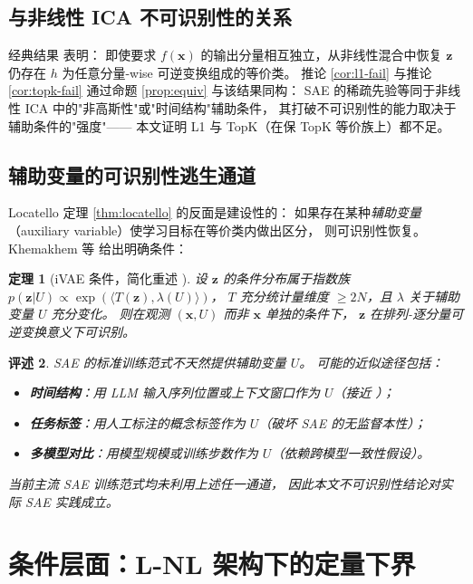 \documentclass[11pt,a4paper]{article}
\newtheorem{theorem}{定理}
\newtheorem{remark}[theorem]{评述}
\theoremstyle{remark}
\newcommand{\Z}{\bm{z}}
\newcommand{\X}{\bm{x}}
\begin{document}
\subsection{与非线性 ICA 不可识别性的关系}

经典结果 \cite{hyvarinen1999} 表明：
即使要求 $f(\X)$ 的输出分量相互独立，从非线性混合中恢复 $\Z$ 仍存在
$h$ 为任意分量-wise 可逆变换组成的等价类。
推论 \ref{cor:l1-fail} 与推论 \ref{cor:topk-fail} 通过命题 \ref{prop:equiv}
与该结果同构：
SAE 的稀疏先验等同于非线性 ICA 中的"非高斯性"或"时间结构"辅助条件，
其打破不可识别性的能力取决于辅助条件的"强度"——
本文证明 L1 与 TopK（在保 TopK 等价族上）都不足。

\subsection{辅助变量的可识别性逃生通道}\label{sec:aux}

Locatello 定理 \ref{thm:locatello} 的反面是建设性的：
如果存在某种\emph{辅助变量}（auxiliary variable）使学习目标在等价类内做出区分，
则可识别性恢复。
Khemakhem 等 \cite{khemakhem2020} 给出明确条件：

\begin{theorem}[iVAE 条件，简化重述 \cite{khemakhem2020}]\label{thm:ivae}
设 $\Z$ 的条件分布属于指数族 $p(\Z|U) \propto \exp(\langle T(\Z), \lambda(U)\rangle)$，
$T$ 充分统计量维度 $\geq 2N$，且 $\lambda$ 关于辅助变量 $U$ 充分变化。
则在观测 $(\X, U)$ 而非 $\X$ 单独的条件下，
$\Z$ 在排列-逐分量可逆变换意义下可识别。
\end{theorem}

\begin{remark}\label{rem:aux-sae}
SAE 的标准训练范式\emph{不}天然提供辅助变量 $U$。
可能的近似途径包括：
\begin{itemize}[leftmargin=*,itemsep=2pt]
\item \textbf{时间结构}：用 LLM 输入序列位置或上下文窗口作为 $U$（接近 \cite{hyvarinen2019time}）；
\item \textbf{任务标签}：用人工标注的概念标签作为 $U$（破坏 SAE 的无监督本性）；
\item \textbf{多模型对比}：用模型规模或训练步数作为 $U$（依赖跨模型一致性假设）。
\end{itemize}
当前主流 SAE 训练范式均未利用上述任一通道，
因此本文不可识别性结论对实际 SAE 实践成立。
\end{remark}

\section{条件层面：L-NL 架构下的定量下界}\label{sec:conditional}
\end{document}
